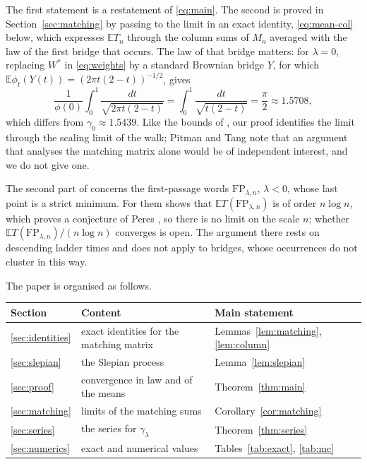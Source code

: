 \documentclass[11pt]{amsart}
\theoremstyle{remark}
\numberwithin{equation}{section}
\newcommand{\EE}{\mathbb{E}}
\begin{document}
The first statement is a restatement of \eqref{eq:main}. The second is proved in Section~\ref{sec:matching} by passing to the limit in an exact identity, \eqref{eq:mean-col} below, which expresses $\EE T_n$ through the column sums of $M_n$ averaged with the law of the first bridge that occurs. The law of that bridge matters: for $\lambda=0$, replacing $W^*$ in \eqref{eq:weights} by a standard Brownian bridge $Y$, for which $\EE\phi_t(Y(t))=(2\pi t(2-t))^{-1/2}$, gives
\[
\frac1{\phi(0)}\int_0^1\frac{dt}{\sqrt{2\pi t(2-t)}}=\int_0^1\frac{dt}{\sqrt{t(2-t)}}=\frac\pi2\approx1.5708,
\]
which differs from $\gamma_0\approx1.5439$. Like the bounds of \cite{PT}, our proof identifies the limit through the scaling limit of the walk; Pitman and Tang note \cite[after Open problem~2.3]{PT} that an argument that analyses the matching matrix alone would be of independent interest, and we do not give one.

The second part of \cite[Open problem~2.3]{PT} concerns the first-passage words $\mathrm{FP}_{\lambda,n}$, $\lambda<0$, whose last point is a strict minimum. For them \cite[Theorem~1.1]{Shm} shows that $\EE T(\mathrm{FP}_{\lambda,n})$ is of order $n\log n$, which proves a conjecture of Peres \cite[Conjecture~1]{PTpub}, so there is no limit on the scale $n$; whether $\EE T(\mathrm{FP}_{\lambda,n})/(n\log n)$ converges is open. The argument there rests on descending ladder times and does not apply to bridges, whose occurrences do not cluster in this way.

The paper is organised as follows.
\begin{center}
\begin{tabular}{lll}
\toprule
Section & Content & Main statement\\
\midrule
\ref{sec:identities} & exact identities for the matching matrix & Lemmas~\ref{lem:matching}, \ref{lem:column}\\
\ref{sec:slepian} & the Slepian process & Lemma~\ref{lem:slepian}\\
\ref{sec:proof} & convergence in law and of the means & Theorem~\ref{thm:main}\\
\ref{sec:matching} & limits of the matching sums & Corollary~\ref{cor:matching}\\
\ref{sec:series} & the series for $\gamma_\lambda$ & Theorem~\ref{thm:series}\\
\ref{sec:numerics} & exact and numerical values & Tables~\ref{tab:exact}, \ref{tab:mc}\\
\bottomrule
\end{tabular}
\end{center}
\end{document}
